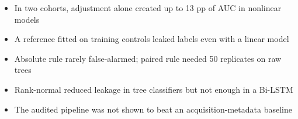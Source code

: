 \begin{itemize}
\item In two cohorts, adjustment alone created up to 13 pp of AUC in nonlinear models
\item A reference fitted on training controls leaked labels even with a linear model
\item Absolute rule rarely false-alarmed; paired rule needed 50 replicates on raw trees
\item Rank-normal reduced leakage in tree classifiers but not enough in a Bi-LSTM
\item The audited pipeline was not shown to beat an acquisition-metadata baseline
\end{itemize}
